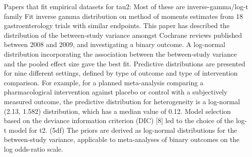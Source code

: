 \begin{outline}
\1 Papers that fit empirical datasets for tau2: Most of these are inverse-gamma/log-t family
    \2 Fit inverse gamma distribution on method of moments estimates from 18 gastroenterology trials with similar endpoints.
    \2 This paper has described the distribution of the between-study variance amongst Cochrane reviews published between 2008 and 2009, and investigating a binary outcome. A log-normal distribution incorporating the association between the between-study variance and the pooled effect size gave the best fit.
    \2 Predictive distributions are presented for nine different settings, defined by type of outcome and type of intervention comparison. For example, for a planned meta-analysis comparing a pharmacological intervention against placebo or control with a subjectively measured outcome, the predictive distribution for heterogeneity is a log-normal (2.13, 1.582) distribution, which has a median value of 0.12.
    \2 Model selection based on the deviance information criterion (DIC) [8] led to the choice of the log-t model for t2. (5df)
    \2 The priors are derived as log-normal distributions for the between-study variance, applicable to meta-analyses of binary outcomes on the log odds-ratio scale.


\end{outline}
